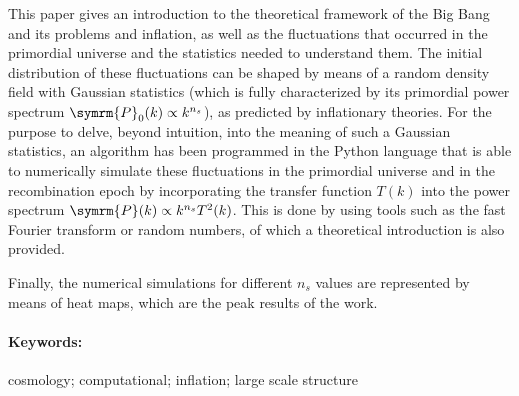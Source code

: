 This paper gives an introduction to the theoretical framework of the Big Bang and its problems and inflation, as well as the fluctuations that occurred in the primordial universe and the statistics needed to understand them. The initial distribution of these fluctuations can be shaped by means of a random density field with Gaussian statistics (which is fully characterized by its primordial power spectrum \(\symrm{P}_0(k)\propto k^{n_s}\)), as predicted by inflationary theories. For the purpose to delve, beyond intuition, into the meaning of such a Gaussian statistics, an algorithm has been programmed in the Python language that is able to numerically simulate these fluctuations in the primordial universe and in the recombination epoch by incorporating the transfer function \(T(k)\) into the power spectrum \(\symrm{P}(k)\propto k^{n_s}T^2(k)\). This is done by using tools such as the fast Fourier transform or random numbers, of which a theoretical introduction is also provided.

Finally, the numerical simulations for different \(n_s\) values are represented by means of heat maps, which are the peak results of the work.
\paragraph{Keywords:} cosmology; computational; inflation; large scale structure